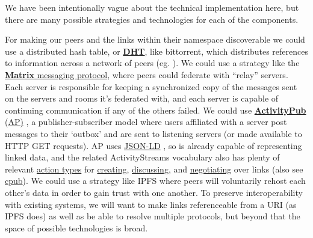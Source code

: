 We have been intentionally vague about the technical implementation
here, but there are many possible strategies and technologies for each
of the components.

For making our peers and the links within their namespace discoverable
we could use a distributed hash table, or
\href{https://en.wikipedia.org/wiki/Distributed_hash_table}{\textbf{DHT}},
like bittorrent, which distributes references to information across a
network of peers (eg. \citep{pirroDHTbasedSemanticOverlay2012} ).
We could use a strategy like the
\href{https://matrix.org/}{\textbf{Matrix} messaging protocol}, where
peers could federate with ``relay'' servers. Each server is responsible
for keeping a synchronized copy of the messages sent on the servers and
rooms it's federated with, and each server is capable of continuing
communication if any of the others failed. We could use
\href{https://www.w3.org/TR/2018/REC-activitypub-20180123/}{\textbf{ActivityPub}
(AP)} \citep{Webber:18:A} , a publisher-subscriber model where
users affiliated with a server post messages to their `outbox' and are
sent to listening servers (or made available to HTTP GET requests). AP
uses \href{https://json-ld.org/}{JSON-LD} \citep{spornyJSONLDJSONbasedSerialization2020} , so is already capable of
representing linked data, and the related ActivityStreams vocabulary
\citep{snellActivityStreams2017}  also has plenty of relevant
\href{https://www.w3.org/TR/activitystreams-vocabulary/\#activity-types}{action
types} for
\href{https://www.w3.org/TR/activitystreams-vocabulary/\#dfn-create}{creating},
\href{https://www.w3.org/TR/activitystreams-vocabulary/\#dfn-question}{discussing},
and
\href{https://www.w3.org/TR/activitystreams-vocabulary/\#dfn-tentativeaccept}{negotiating}
over links (also see
\href{https://github.com/openEngiadina/cpub}{cpub}). We could use a
strategy like IPFS where peers will voluntarily rehost each other's data
in order to gain trust with one another. To preserve interoperability
with existing systems, we will want to make links referenceable from a
URI (as IPFS does) as well as be able to resolve multiple protocols, but
beyond that the space of possible technologies is broad.

